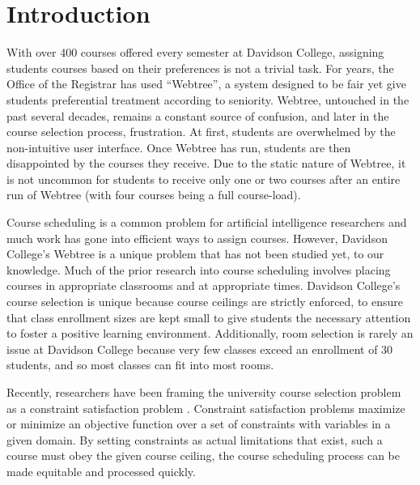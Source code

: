 
\section{Introduction}
\label{sec:intro}

With over 400 courses offered every semester at Davidson College,
assigning students courses based on their preferences is not a trivial
task. For years, the Office of the Registrar has used ``Webtree'', a
system designed to be fair yet give students preferential treatment
according to seniority. Webtree, untouched in the past several decades, remains a constant
source of confusion, and later in the course selection process,
frustration. At first, students are overwhelmed by the non-intuitive
user interface. Once Webtree has run, students are then disappointed
by the courses they receive. Due to the static nature of Webtree, it
is not uncommon for students to receive only one or two courses after
an entire run of Webtree (with four courses being a full
course-load). 

Course scheduling is a common problem for artificial intelligence
researchers and much work has gone into efficient ways to assign
courses. However, Davidson College's Webtree is a unique problem that
has not been studied yet, to our knowledge. Much of the prior research
into course scheduling involves placing courses in appropriate
classrooms and at appropriate times. Davidson College's course
selection is unique because course ceilings are strictly enforced, to
ensure that class enrollment sizes are kept small to give students the
necessary attention to foster a positive learning
environment. Additionally, room selection is rarely an issue at
Davidson College because very few classes exceed an enrollment of $30$
students, and so most classes can fit into most rooms.

Recently, researchers have been framing the university course
selection problem as a constraint satisfaction problem
\cite{darden}. Constraint satisfaction problems maximize or minimize
an objective function over a set of constraints with variables in a
given domain. By setting constraints as actual limitations that exist,
such a course must obey the given course ceiling, the course
scheduling process can be made equitable and processed quickly.
 
